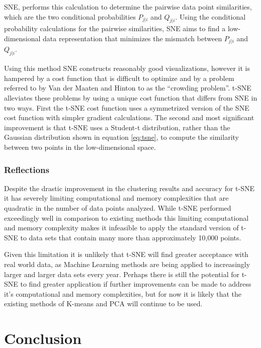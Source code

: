 \documentclass{article}
\begin{document}
SNE, performs this calculation to determine the pairwise data point similarities, which are the two conditional probabilities  $P_{j|i}$ and $Q_{j|i}$. Using the conditional probability calculations for the pairwise similarities, SNE aims to find a low-dimensional data representation that minimizes the mismatch between $P_{j|i}$ and $Q_{j|i}$.

Using this method SNE constructs reasonably good visualizations, however it is hampered by a cost function that is difficult to optimize and by a problem referred to by Van der Maaten and Hinton to as the ``crowding problem''\cite{van2008visualizing}. t-SNE alleviates these problems by using a unique cost function that differs from SNE in two ways. First the t-SNE cost function uses a symmetrized version of the SNE cost function with simpler gradient calculations. The second and most significant improvement is that t-SNE uses a Student-t distribution, rather than the Gaussian distribution shown in equation \ref{eq:tsne}, to compute the similarity between two points in the low-dimensional space.


\subsubsection{Reflections}

Despite the drastic improvement in the clustering results and accuracy for t-SNE it has severely limiting computational and memory complexities that are quadratic in the number of data points analyzed\cite{van2008visualizing}. While t-SNE performed exceedingly well in comparison to existing methods this limiting computational and memory complexity makes it infeasible to apply the standard version of t-SNE to data sets that contain many more than approximately 10,000 points\cite{van2008visualizing}.

Given this limitation it is unlikely that t-SNE will find greater acceptance with real world data, as Machine Learning methods are being applied to increasingly larger and larger data sets every year\cite{lohr2012age}. Perhaps there is still the potential for t-SNE to find greater application if further improvements can be made to address it's computational and memory complexities, but for now it is likely that the existing methods of K-means and PCA will continue to be used.





\section{Conclusion}
\end{document}
